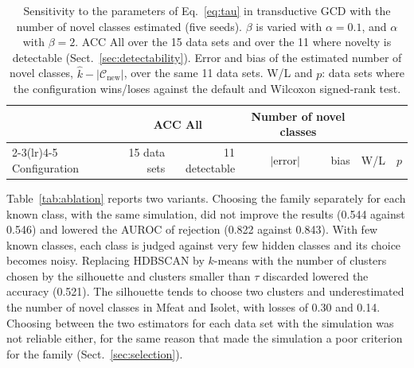 \documentclass[pdflatex,sn-basic]{sn-jnl}
\newcommand{\Cnew}{\mathcal{C}_{\mathrm{new}}}
\begin{document}
\begin{table}[t]
\caption{Sensitivity to the parameters of Eq.~\eqref{eq:tau} in transductive GCD with the number of novel classes estimated (five seeds). $\beta$ is varied with $\alpha = 0.1$, and $\alpha$ with $\beta = 2$. ACC All over the 15 data sets and over the 11 where novelty is detectable (Sect.~\ref{sec:detectability}). Error and bias of the estimated number of novel classes, $\hat{k} - |\Cnew|$, over the same 11 data sets. W/L and $p$: data sets where the configuration wins/loses against the default and Wilcoxon signed-rank test.}\label{tab:tau}
\centering\footnotesize
\begin{tabular}{@{}lrrrrrr@{}}
\toprule
 & \multicolumn{2}{c}{ACC All} & \multicolumn{2}{c}{Number of novel classes} & & \\
\cmidrule(lr){2-3}\cmidrule(lr){4-5}
Configuration & 15 data sets & 11 detectable & $|$error$|$ & bias & W/L & $p$ \\
\midrule

\end{tabular}
\end{table}


Table~\ref{tab:ablation} reports two variants. Choosing the family separately for each known class, with the same simulation, did not improve the results (0.544 against 0.546) and lowered the AUROC of rejection (0.822 against 0.843). With few known classes, each class is judged against very few hidden classes and its choice becomes noisy. Replacing HDBSCAN by $k$-means with the number of clusters chosen by the silhouette and clusters smaller than $\tau$ discarded lowered the accuracy (0.521). The silhouette tends to choose two clusters and underestimated the number of novel classes in Mfeat and Isolet, with losses of 0.30 and 0.14. Choosing between the two estimators for each data set with the simulation was not reliable either, for the same reason that made the simulation a poor criterion for the family (Sect.~\ref{sec:selection}).
\end{document}
